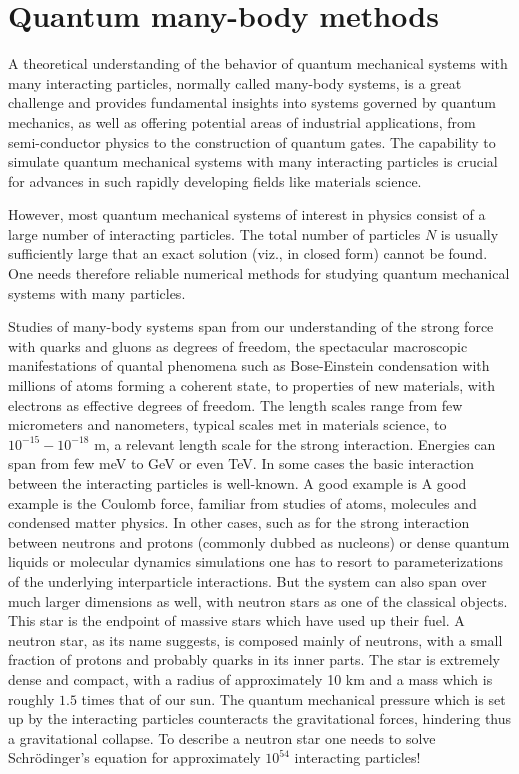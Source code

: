 \documentclass[twoside,english]{uiofysmaster}
\begin{document}
\section{Quantum many-body methods}
A theoretical understanding of the behavior of quantum mechanical
systems with many interacting particles, normally called many-body
systems, is a great challenge and provides fundamental insights into
systems governed by quantum mechanics, as well as offering potential
areas of industrial applications, from semi-conductor physics to the
construction of quantum gates.  The capability to simulate quantum
mechanical systems with many interacting particles is crucial for
advances in such rapidly developing fields like materials science.

However, most quantum mechanical systems of interest in physics
consist of a large number of interacting particles.  The total number
of particles $N$ is usually sufficiently large that an exact solution
(viz., in closed form) cannot be found.  One needs therefore reliable
numerical methods for studying quantum mechanical systems with many
particles.


Studies of many-body systems span from our understanding of the strong
force with quarks and gluons as degrees of freedom, the spectacular
macroscopic manifestations of quantal phenomena such as Bose-Einstein
condensation with millions of atoms forming a coherent state, to
properties of new materials, with electrons as effective degrees of
freedom. The length scales range from few micrometers and nanometers,
typical scales met in materials science, to $10^{-15}-10^{-18}$ m, a
relevant length scale for the strong interaction. Energies can span
from few meV to GeV or even TeV.  In some cases the basic interaction
between the interacting particles is well-known.  A good example is
 A good example is
the Coulomb force, familiar from studies of atoms, molecules and
condensed matter physics.  In other cases, such as for the strong
interaction between neutrons and protons (commonly dubbed as nucleons)
or dense quantum liquids or molecular dynamics simulations one has to
resort to parameterizations of the underlying interparticle
interactions.  But the system can also span over much larger
dimensions as well, with neutron stars as one of the classical
objects.  This star is the endpoint of massive stars which have used
up their fuel.  A neutron star, as its name suggests, is composed
mainly of neutrons, with a small fraction of protons and probably
quarks in its inner parts.  The star is extremely dense and compact,
with a radius of approximately 10 km and a mass which is roughly $1.5$
times that of our sun. The quantum mechanical pressure which is set up
by the interacting particles counteracts the gravitational forces,
hindering thus a gravitational collapse.  To describe a neutron star
one needs to solve Schr\"odinger's equation for approximately
$10^{54}$ interacting particles!
\end{document}

